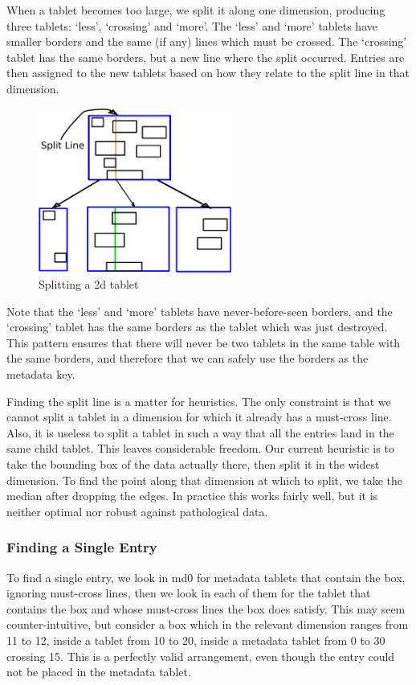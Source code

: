 \documentclass[11pt]{article}
\begin{document}
When a tablet becomes too large, we split it along one dimension, producing three tablets: `less', `crossing' and `more'. The `less' and `more' tablets have smaller borders and the same (if any) lines which must be crossed. The `crossing' tablet has the same borders, but a new line where the split occurred. Entries are then assigned to the new tablets based on how they relate to the split line in that dimension.

\begin{figure}[h]
\centering
\includegraphics[width=2.5in]{tabsplit}
\caption{Splitting a 2d tablet}
\label{fig:split}
\end{figure}

Note that the `less' and `more' tablets have never-before-seen borders, and the `crossing' tablet has the same borders as the tablet which was just destroyed. This pattern ensures that there will never be two tablets in the same table with the same borders, and therefore that we can safely use the borders as the metadata key.

Finding the split line is a matter for heuristics. The only constraint is that we cannot split a tablet in a dimension for which it already has a must-cross line. Also, it is useless to split a tablet in such a way that all the entries land in the same child tablet. This leaves considerable freedom. Our current heuristic is to take the bounding box of the data actually there, then split it in the widest dimension. To find the point along that dimension at which to split, we take the median after dropping the edges. In practice this works fairly well, but it is neither optimal nor robust against pathological data.

\subsubsection{Finding a Single Entry}

To find a single entry, we look in md0 for metadata tablets that contain the box, ignoring must-cross lines, then we look in each of them for the tablet that contains the box and whose must-cross lines the box does satisfy. This may seem counter-intuitive, but consider a box which in the relevant dimension ranges from 11 to 12, inside a tablet from 10 to 20, inside a metadata tablet from 0 to 30 crossing 15. This is a perfectly valid arrangement, even though the entry could not be placed in the metadata tablet.
\end{document}
